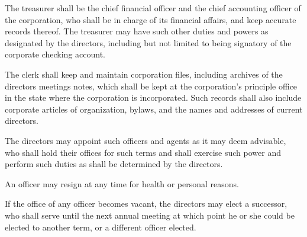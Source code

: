 \begin{art}
\begin{asec}
\end{asec}
\begin{asec}[Treasurer]

The treasurer shall be the chief financial officer and the chief
accounting officer of the corporation, who shall be in charge of
its financial affairs, and keep accurate records thereof.  The
treasurer may have such other duties and powers as designated by
the directors, including but not limited to being signatory of the
corporate checking account.


\end{asec}

\begin{asec}[Clerk]

The clerk shall keep and maintain corporation files, including
archives of the directors meetings notes, which shall be kept at
the corporation's principle office in the state where the
corporation is incorporated.  Such records shall also include
corporate articles of organization, bylaws, and the names and
addresses of current directors.

\end{asec}

\begin{asec}

The directors may appoint such officers and agents as it may deem
advisable, who shall hold their offices for such terms and shall
exercise such power and perform such duties as shall be determined
by the directors.

\end{asec}

\begin{asec}[Resignation]

An officer may resign at any time for health or personal reasons.

\end{asec}


\begin{asec}[Vacancies]

If the office of any officer becomes vacant, the directors may
elect a successor, who shall serve until the next annual meeting
at which point he or she could be elected to another term, or a
different officer elected.

\end{asec}

\end{art}

